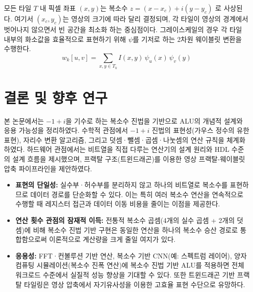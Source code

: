 \documentclass[10pt,a4paper,notitlepage]{report}
\begin{document}
\begin{multicols*}{2}
모든 타일 $T$ 내 픽셀 좌표 $(x, y)$는 복소수 $z = (x - x_c) + i (y - y_c)$ 로 사상된다. 여기서 $(x_c, y_c)$는 영상의 크기에 따라 달리 결정되며, 각 타일이 영상의 경계에서 벗어나지 않으면서 빈 공간을 최소화 하는 중심점이다. 그레이스케일의 경우 각 타일 내부의 화소값을 효율적으로 표현하기 위해 $\psi$를 기저로 하는 2차원 웨이블릿 변환을 수행한다.
$$
w_k[u, v] = \sum_{x, y \in T_k} I(x, y) \, \psi_{u}(x)\, \psi_{v}(y)
$$

\section{결론 및 향후 연구}
본 논문에서는 $-1+i$을 기수로 하는 복소수 진법을 기반으로 ALU의 개념적 설계와 응용 가능성을 정리하였다. 수학적 관점에서 $-1+i$ 진법의 표현성(가우스 정수의 유한 표현), 자리수 변환 알고리즘, 그리고 덧셈·뺄셈·곱셈·나눗셈의 연산 규칙을 체계화하였다. 하드웨어 관점에서는 비트열을 직접 다루는 연산기의 설계 원리와 HDL 수준의 설계 흐름을 제시했으며, 프랙탈 구조(트윈드래곤)를 이용한 영상 프랙탈-웨이블릿 압축 파이프라인을 제안하였다.
\begin{itemize}
\item \textbf{표현의 단일성:} 실수부·허수부를 분리하지 않고 하나의 비트열로 복소수를 표현하므로 데이터 경로를 단순화할 수 있다. 이는 특히 여러 복소수 연산을 연속적으로 수행할 때 레지스터 접근과 데이터 이동 비용을 줄이는 이점을 제공한다.
\item \textbf{연산 횟수 관점의 잠재적 이득:} 전통적 복소수 곱셈(4개의 실수 곱셈 + 2개의 덧셈)에 비해 복소수 진법 기반 구현은 동일한 연산을 하나의 복소수 승산 경로로 통합함으로써 이론적으로 계산량을 크게 줄일 여지가 있다.
\item \textbf{응용성:} FFT·컨볼루션 기반 연산, 복소수 기반 CNN(예: 스펙트럼 레이어), 양자컴퓨팅 시뮬레이션(복소수 진폭 연산)에 복소수 진법 기반 ALU를 적용하면 전체 워크로드 수준에서 실질적 성능 향상을 기대할 수 있다. 또한 트윈드래곤 기반 프랙탈 타일링은 영상 압축에서 자기유사성을 이용한 고효율 표현 수단으로 유망하다.
\end{itemize}
\vspace{0.4cm}


\end{multicols*}
\end{document}
